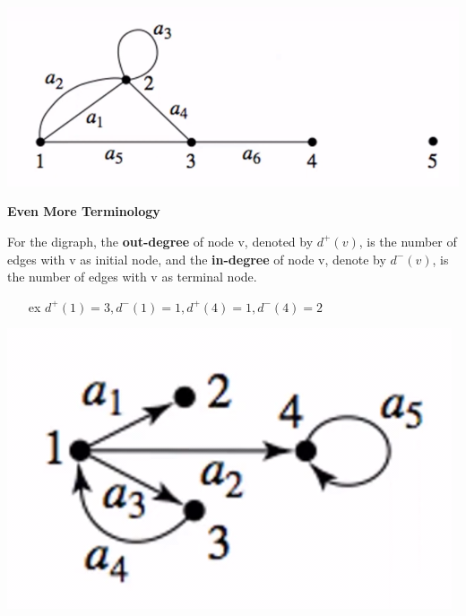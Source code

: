 \documentclass[12pt, letterpaper]{article}
\begin{document}
\begin{minipage}[t]{0.35\linewidth}
    \centering
    \strut\vspace*{3\baselineskip}\newline\includegraphics[width=\linewidth]{graphex1.png} \smallbreak
\end{minipage}

\pagebreak
\vspace*{-2cm}
\textbf{Even More Terminology} \smallbreak
\begin{minipage}[t]{0.75\linewidth}
	For the digraph, the \textbf{out-degree} of node v, denoted by $d^+(v)$, is the number of edges with v as initial node, and the \textbf{in-degree} of node v, denote by $d^-(v)$, is the number of edges with v as terminal node.
	\begin{itemize}
		\item[\tiny ex] $d^+(1) = 3, d^-(1) = 1, d^+(4) = 1, d^-(4) = 2$ 
	\end{itemize}
\end{minipage}
\begin{minipage}[t]{0.25\linewidth}
    \centering
    \strut\vspace*{-2\baselineskip}\newline\includegraphics[width=\linewidth]{graphex2.png} \smallbreak
\end{minipage}
\end{document}
